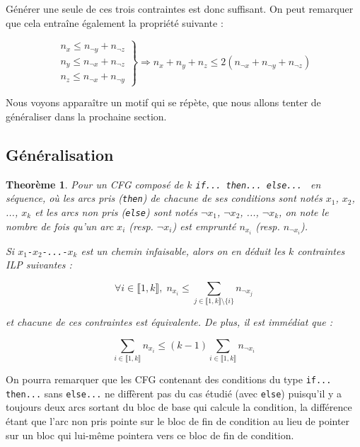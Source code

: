 \documentclass[french]{article}
\newtheorem{theorem}{Theorème}
\begin{document}
  Générer une seule de ces trois contraintes est donc suffisant. On peut remarquer que cela entraîne également la propriété suivante :

  \[
    \left.
    \begin{array}{c}
      n_x \leq n_{\neg y} + n_{\neg z}\\
      n_y \leq n_{\neg x} + n_{\neg z}\\
      n_z \leq n_{\neg x} + n_{\neg y}
    \end{array}
    \right\} \Longrightarrow n_x+n_y+n_z \leq 2(n_{\neg x} + n_{\neg y} + n_{\neg z})
  \]


  Nous voyons apparaître un motif qui se répète, que nous allons tenter de généraliser dans la prochaine section.

  \subsection{Généralisation}
  \begin{theorem}
    Pour un CFG composé de $k$ \texttt{if... then... else... } en séquence, où les arcs pris (\texttt{then}) de chacune de ses conditions sont notés $x_1$, $x_2$, ..., $x_k$ et les arcs non pris (\texttt{else}) sont notés $\neg x_1$, $\neg x_2$, ..., $\neg x_k$, on note le nombre de fois qu'un arc $x_i$ (resp. $\neg x_i$) est emprunté $n_{x_i}$ (resp. $n_{\neg x_i}$).

    Si $x_1$\texttt{-}$x_2$\texttt{-...-}$x_k$ est un chemin infaisable, alors on en déduit les $k$ contraintes ILP suivantes :

    \[\forall i \in \llbracket 1, k \rrbracket,\; n_{x_i} \leq \sum_{j \in \llbracket 1, k \rrbracket \setminus \{i\}} n_{\neg x_j} \]

    et chacune de ces contraintes est équivalente. De plus, il est immédiat que : %

    \[ \sum_{i \in \llbracket 1, k \rrbracket} n_{x_i} \leq (k-1) \sum_{i \in \llbracket 1, k \rrbracket} n_{\neg x_i} \]
  \end{theorem}

  On pourra remarquer que les CFG contenant des conditions du type \texttt{if... then...} sans \texttt{else...} ne diffèrent pas du cas étudié (avec \texttt{else}) puisqu'il y a toujours deux arcs sortant du bloc de base qui calcule la condition, la différence étant que l'arc non pris pointe sur le bloc de fin de condition au lieu de pointer sur un bloc qui lui-même pointera vers ce bloc de fin de condition.
\end{document}
